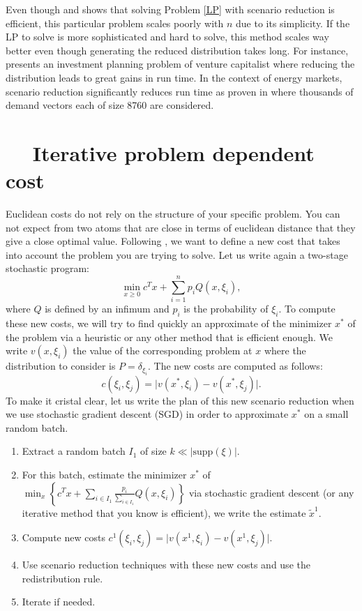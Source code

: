 \documentclass{amsart}
\begin{document}
Even though  and  shows that solving Problem \ref{LP} with scenario reduction is efficient, this particular problem scales poorly with $n$ due to its simplicity. If the LP to solve is more sophisticated and hard to solve, this method scales way better even though generating the reduced distribution takes long. For instance, \cite[Section 5.2]{rujeerapaiboon_scenario_2022} presents an investment planning problem of venture capitalist where reducing the distribution leads to great gains in run time. In the context of energy markets, scenario reduction significantly reduces run time as proven in \cite{morales_scenario_2009} where thousands of demand vectors each of size 8760 are considered.

\section{$\quad$ Iterative problem dependent cost}
Euclidean costs do not rely on the structure of your specific problem. You can not expect from two atoms that are close in terms of euclidean distance that they give a close optimal value. Following , we want to define a new cost that takes into account the problem you are trying to solve. Let us write again a two-stage stochastic program:
$$
\min_{x\geq 0}c^Tx+\sum_{i=1}^np_iQ\left(x,\xi_i\right),
$$
where $Q$ is defined by an infimum and $p_i$ is the probability of $\xi_i$. To compute these new costs, we will try to find quickly an approximate of the minimizer $x^*$ of the problem via a heuristic or any other method that is efficient enough. We write $v\left(x,\xi_i\right)$ the value of the corresponding problem at $x$ where the distribution to consider is $P=\delta_{\xi_i}$. The new costs are computed as follows:
$$
c\left(\xi_i,\xi_j\right)=\lvert v\left(x^*,\xi_i\right)-v\left(x^*,\xi_j\right)\rvert.
$$
To make it cristal clear, let us write the plan of this new scenario reduction when we use stochastic gradient descent (SGD) in order to approximate $x^*$ on a small random batch.
\begin{enumerate}
    \item Extract a random batch $I_1$ of size $k\ll \lvert \text{supp}\left(\xi\right)\rvert$.
    \item For this batch, estimate the minimizer $x^*$ of $\min_{x}\left\{c^Tx+\sum_{i\in I_1}\frac{p_i}{\sum_{i\in I_1}}Q\left(x,\xi_i\right)\right\}$ via stochastic gradient descent (or any iterative method that you know is efficient), we write the estimate $\tilde{x}^1$.
    \item Compute new costs $c^1\left(\xi_i,\xi_j\right)=\lvert v\left(x^1,\xi_i\right)-v\left(x^1,\xi_j\right)\rvert$.
    \item Use scenario reduction techniques with these new costs and use the redistribution rule.
    \item Iterate if needed.
\end{enumerate}
\end{document}
